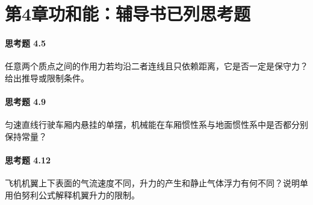\section*{第4章\quad 功和能：辅导书已列思考题}
\paragraph{思考题 4.5}
任意两个质点之间的作用力若均沿二者连线且只依赖距离，它是否一定是保守力？给出推导或限制条件。

\paragraph{思考题 4.9}
匀速直线行驶车厢内悬挂的单摆，机械能在车厢惯性系与地面惯性系中是否都分别保持常量？

\paragraph{思考题 4.12}
飞机机翼上下表面的气流速度不同，升力的产生和静止气体浮力有何不同？说明单用伯努利公式解释机翼升力的限制。
